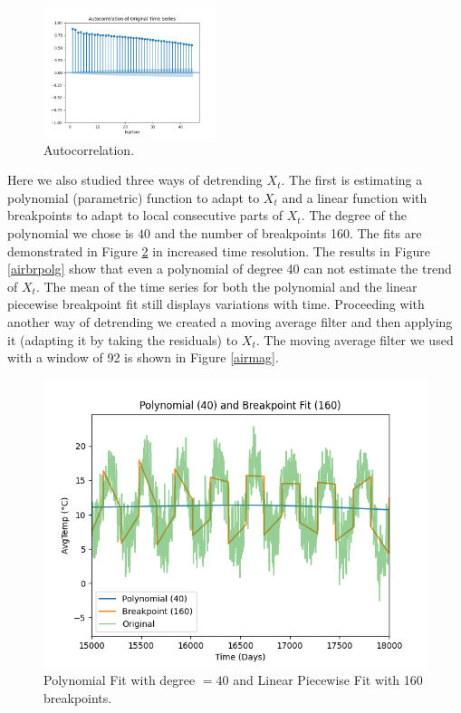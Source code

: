 \documentclass[conference]{IEEEtran}
\begin{document}
\begin{figure}[ht]
    \centering
    \includegraphics[width=0.45\textwidth]{Figures/GlasnevinLin/Autocorrelation of Original Time Series.png}
    \caption{Autocorrelation.}
    \label{tempcfg}
\end{figure}

Here we also studied three ways of detrending $X_t$. The first is estimating a polynomial (parametric) function to adapt to $X_t$ and a linear function with breakpoints to adapt to local consecutive parts of $X_t$. The degree of the polynomial we chose is $40$ and the number of breakpoints 160. The fits are demonstrated in Figure \ref{airpolbrg} in increased time resolution. The results in Figure \ref{airbrpolg} show that even a polynomial of degree 40 can not estimate the trend of $X_t$. The mean of the time series for both the polynomial and the linear piecewise breakpoint fit still displays variations with time. Proceeding with another way of detrending we created a moving average filter and then applying it (adapting it by taking the residuals) to $X_t$. The moving average filter we used with a window of 92 is shown in Figure \ref{airmag}.

\begin{figure}[ht]
    \centering
    \includegraphics[scale=0.4]{Figures/GlasnevinLin/Polynomial (40) and Breakpoint Fit (160).png}
    \caption{Polynomial Fit with degree $= 40$ and Linear Piecewise Fit with 160 breakpoints.}
    \label{airpolbrg}
\end{figure}
\end{document}
